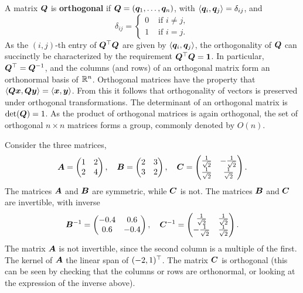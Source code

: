 \documentclass[11pt,a4paper]{memoir}
\begin{document}
A matrix $\bm{Q}$ is \textbf{orthogonal} if $\bm{Q}=(\bm{q}_1,\dots,\bm{q}_n)$, with $\langle {\bm{q}_i}, {\bm{q}_j} \rangle=\delta_{ij}$, and
\begin{equation*}
\delta_{ij}=\begin{cases} 0 &\text{ if } i\neq j,\\
             1 &\text{ if } i=j.
            \end{cases}
\end{equation*}
As the $(i,j)$-th entry of $\bm{Q}^{\top}\bm{Q}$ are given by $\langle {\bm{q}_i}, {\bm{q}_j} \rangle$, the orthogonality of $\bm{Q}$ can succinctly be characterized by the requirement $\bm{Q}^{\top}\bm{Q}=\bm{1}$. In particular, $\bm{Q}^{\top}=\bm{Q}^{-1}$, and the columns (and rows) of an orthogonal matrix form an orthonormal basis of $\mathbb{R}^n$. 
Orthogonal matrices have the property that $\langle {\bm{Q}\bm{x}}, {\bm{Q}\bm{y}} \rangle=\langle {\bm{x}}, {\bm{y}} \rangle$. 
From this it follows that orthogonality of vectors is preserved under orthogonal transformations. The determinant of an orthogonal matrix is $\det(\bm{Q})=1$.
As the product of orthogonal matrices is again orthogonal, the set of orthogonal $n\times n$ matrices forms a group, commonly denoted by $O(n)$.

\begin{example}
Consider the three matrices,
\begin{equation*}
 \bm{A} = \begin{pmatrix}
 1 & 2\\
 2 & 4
 \end{pmatrix}, \quad
 \bm{B}=\begin{pmatrix}
 2 & 3\\
 3 & 2
 \end{pmatrix},
 \quad
 \bm{C} = \begin{pmatrix}
 \frac{1}{\sqrt{2}}&-\frac{1}{\sqrt{2}}\\
 \frac{1}{\sqrt{2}}& \frac{1}{\sqrt{2}}
 \end{pmatrix}.
\end{equation*}
The matrices $\bm{A}$ and $\bm{B}$ are symmetric, while $\bm{C}$ is not. The matrices $\bm{B}$ and $\bm{C}$ are invertible, with inverse
\begin{equation*}
  \bm{B}^{-1} = \begin{pmatrix}
  -0.4 & 0.6\\
  0.6 & -0.4
  \end{pmatrix}, \quad
  \bm{C}^{-1} = \begin{pmatrix}
  \frac{1}{\sqrt{2}}&\frac{1}{\sqrt{2}}\\
 -\frac{1}{\sqrt{2}}& \frac{1}{\sqrt{2}}
  \end{pmatrix}.
\end{equation*}
The matrix $\bm{A}$ is not invertible, since the second column is a multiple of the first. The kernel of $\bm{A}$ the linear span of $(-2,1)^{\top}$. The matrix $\bm{C}$ is orthogonal (this can be seen by checking that the columns or rows are orthonormal, or looking at the expression of the inverse above). 
\end{example}
\end{document}
